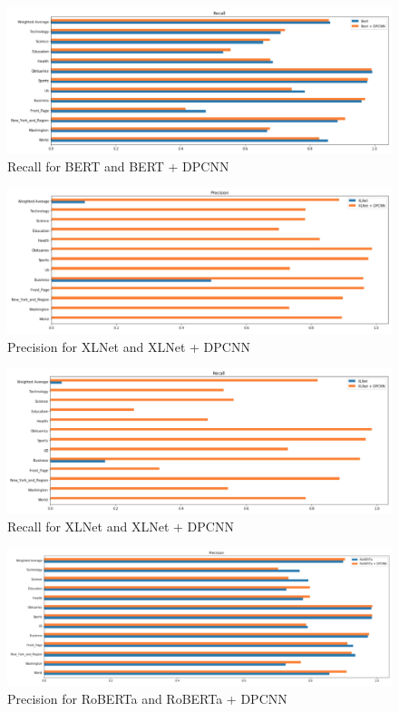 \documentclass{article}
\begin{document}
\begin{figure}[!htb]
    \centering
    \includegraphics[scale=0.6]{images/recall_bert.png}
    \caption{Recall for BERT and BERT + DPCNN}
    \label{fig:recall_bert}
\end{figure}

\begin{figure}[!htb]
    \centering
    \includegraphics[scale=0.6]{images/precision_xlnet.png}
    \caption{Precision for XLNet and XLNet + DPCNN}
    \label{fig:precision_xlnet}
\end{figure}

\begin{figure}
    \centering
    \includegraphics[scale=0.6]{images/recall_xlnet.png}
    \caption{Recall for XLNet and XLNet + DPCNN}
    \label{fig:recall_xlnet}
\end{figure}

\begin{figure}
    \centering
    \includegraphics[scale=0.6]{images/precision_roberta.png}
    \caption{Precision for RoBERTa and RoBERTa + DPCNN}
    \label{fig:precision_roberta}
\end{figure}
\end{document}
